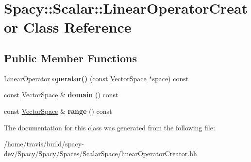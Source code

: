 \hypertarget{classSpacy_1_1Scalar_1_1LinearOperatorCreator}{\section{\-Spacy\-:\-:\-Scalar\-:\-:\-Linear\-Operator\-Creator \-Class \-Reference}
\label{classSpacy_1_1Scalar_1_1LinearOperatorCreator}
}
\subsection*{\-Public \-Member \-Functions}
\begin{DoxyCompactItemize}
\item 
\hypertarget{classSpacy_1_1Scalar_1_1LinearOperatorCreator_ac6dfc55efe19059448b54dd67ab8c9ce}{\hyperlink{structSpacy_1_1Scalar_1_1LinearOperator}{\-Linear\-Operator} {\bfseries operator()} (const \hyperlink{classSpacy_1_1VectorSpace}{\-Vector\-Space} $\ast$space) const }\label{classSpacy_1_1Scalar_1_1LinearOperatorCreator_ac6dfc55efe19059448b54dd67ab8c9ce}

\item 
\hypertarget{classSpacy_1_1Scalar_1_1LinearOperatorCreator_a4485d5a4718ec8211eae5c74090b1331}{const \hyperlink{classSpacy_1_1VectorSpace}{\-Vector\-Space} \& {\bfseries domain} () const }\label{classSpacy_1_1Scalar_1_1LinearOperatorCreator_a4485d5a4718ec8211eae5c74090b1331}

\item 
\hypertarget{classSpacy_1_1Scalar_1_1LinearOperatorCreator_adcd36576ce3d569e0e4709f8433cc372}{const \hyperlink{classSpacy_1_1VectorSpace}{\-Vector\-Space} \& {\bfseries range} () const }\label{classSpacy_1_1Scalar_1_1LinearOperatorCreator_adcd36576ce3d569e0e4709f8433cc372}

\end{DoxyCompactItemize}


\-The documentation for this class was generated from the following file\-:\begin{DoxyCompactItemize}
\item 
/home/travis/build/spacy-\/dev/\-Spacy/\-Spacy/\-Spaces/\-Scalar\-Space/linear\-Operator\-Creator.\-hh\end{DoxyCompactItemize}
